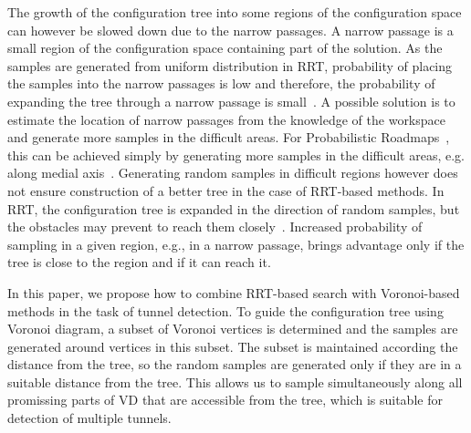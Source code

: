 \documentclass{llncs}
\begin{document}
The growth of the configuration tree into some regions of the configuration space can however be slowed down due to the narrow passages.
A narrow passage is a small region of the configuration space containing part of the solution.
As the samples are generated from uniform distribution in RRT, probability of placing the samples into the narrow passages is low and therefore,
   the probability of expanding the tree through a narrow passage is small~\cite{hannaWIS}.
A possible solution is to estimate the location of narrow passages from the knowledge of the workspace and generate more samples
in the difficult areas.
For Probabilistic Roadmaps~\cite{kavrakiPRM}, this can be achieved simply by generating more samples in the difficult areas, e.g. along
medial axis~\cite{wilmarthMAPRM,foskey01hybrid,guibas1999probabilistic,hoff2000interactive,yang2004adapting}.
Generating random samples in difficult regions however does not ensure construction of a better tree in the case of RRT-based methods. 
In RRT, the configuration tree is expanded in the direction of random samples, but the obstacles may prevent to reach them closely~\cite{vonasekphd}.
Increased probability of sampling in a given region, e.g., in a narrow passage, 
brings advantage only if the tree is close to the region and if it can reach it.

In this paper, we propose how to combine RRT-based search with Voronoi-based methods in the task of tunnel detection. 
To guide the configuration tree using Voronoi diagram, a subset of Voronoi vertices is determined and
the samples are generated around vertices in this subset.
The subset is maintained according the distance from the tree, so the random samples
are generated only if they are in a suitable distance from the tree.
This allows us to sample simultaneously along all promissing parts of VD that are accessible from the tree, which is 
suitable for detection of multiple tunnels.
\end{document}

